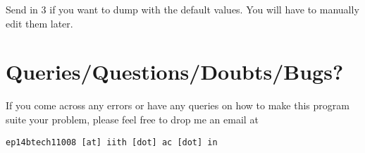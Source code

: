 \documentclass{article}
\begin{document}
Send in $3$ if you want to dump with the default values. You will have to manually edit them later.  
\section*{\hfill Queries/Questions/Doubts/Bugs?}
\par If you come across any errors or have any queries on how to make this program suite your problem, please feel free to drop me an email at 
\begin{verbatim}
ep14btech11008 [at] iith [dot] ac [dot] in
\end{verbatim}
\end{document}
